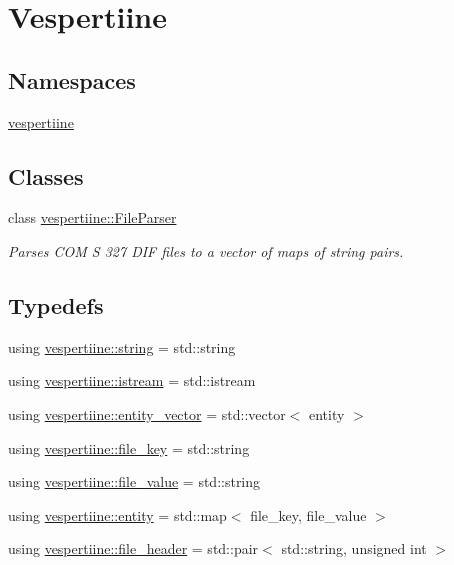 \hypertarget{group__vespertiine}{}\section{Vespertiine}
\label{group__vespertiine}
\subsection*{Namespaces}
\begin{DoxyCompactItemize}
\item 
 \hyperlink{namespacevespertiine}{vespertiine}
\end{DoxyCompactItemize}
\subsection*{Classes}
\begin{DoxyCompactItemize}
\item 
class \hyperlink{classvespertiine_1_1FileParser}{vespertiine\+::\+File\+Parser}
\begin{DoxyCompactList}\small\item\em Parses C\+OM S 327 D\+IF files to a vector of maps of string pairs. \end{DoxyCompactList}\end{DoxyCompactItemize}
\subsection*{Typedefs}
\begin{DoxyCompactItemize}
\item 
using \hyperlink{group__vespertiine_ga7e5191e67b3b71f8044b653a3f9b2065}{vespertiine\+::string} = std\+::string
\item 
using \hyperlink{group__vespertiine_ga338498d8eeb1f5a3da1f237df24c4250}{vespertiine\+::istream} = std\+::istream
\item 
using \hyperlink{group__vespertiine_ga01f4e06d9363d6dc31a69d8a0553b93d}{vespertiine\+::entity\+\_\+vector} = std\+::vector$<$ entity $>$
\item 
using \hyperlink{group__vespertiine_ga39a811996b190f9e1ffa0663d4f5744a}{vespertiine\+::file\+\_\+key} = std\+::string
\item 
using \hyperlink{group__vespertiine_ga546be9d1b39ff78c5bf63e598bc51a0a}{vespertiine\+::file\+\_\+value} = std\+::string
\item 
using \hyperlink{group__vespertiine_gaf9205d715bdeade18d7039864ef59b44}{vespertiine\+::entity} = std\+::map$<$ file\+\_\+key, file\+\_\+value $>$
\item 
using \hyperlink{group__vespertiine_ga1294ff353dd9ea9b26cf4a1573db109e}{vespertiine\+::file\+\_\+header} = std\+::pair$<$ std\+::string, unsigned int $>$
\end{DoxyCompactItemize}
